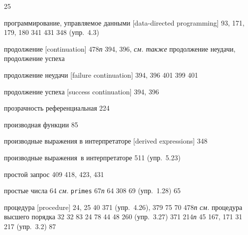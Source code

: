 \begin{theindex}
   25
\item {программирование, управляемое данными [data-directed programming]} 93, 171, 179, 180
   341
   431
   348 (упр.~4.3)
\item {продолжение [continuation]}
   478{\it п}
   394, 396, {\it см. также} продолжение неудачи, продолжение успеха
\item {продолжение неудачи [failure continuation]} 394, 396
   401
   399
   401
\item {продолжение успеха [success continuation]} 394, 396
\item {прозрачность референциальная} 224
\item {производная функции} 85
\item {производные выражения в интерпретаторе [derived expressions]} 348
\item {производные выражения~в интерпретаторе}
   511 (упр.~5.23)
\item {простой запрос} 409
   418, 423, 431
\item {простые числа} 64
   {\it см.} \texttt{primes}
   67{\it п}
   64
   308
   69 (упр.~1.28)
   65
\item {процедура [procedure]} 24, 25
   40
   371 (упр.~4.26), 379
   75
   70
   478{\it п}
   {\it см.} процедура высшего порядка
   32
   32
   83
   24
   78
   44
   48
   260 (упр.~3.27)
   371
   214{\it п}
   45
   167, 171
   31
   217 (упр.~3.2)
   87

\end{theindex}
